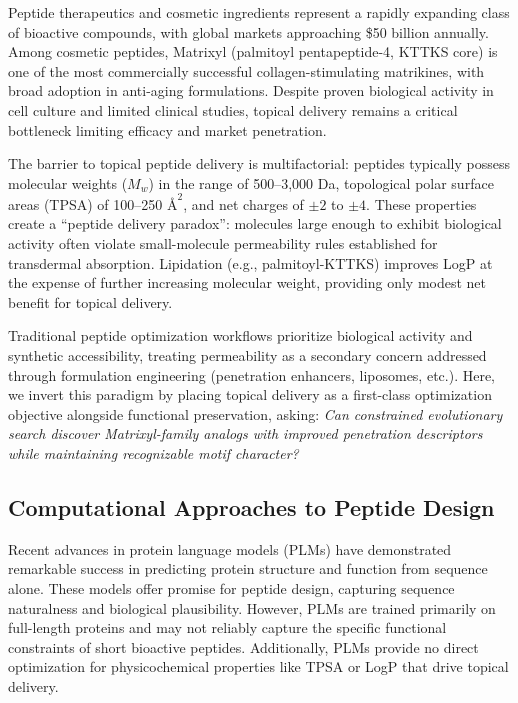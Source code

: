 \documentclass[11pt,a4paper]{article}
\begin{document}
Peptide therapeutics and cosmetic ingredients represent a rapidly expanding class of bioactive compounds, with global markets approaching \$50 billion annually\cite{peptide2024}. Among cosmetic peptides, Matrixyl (palmitoyl pentapeptide-4, KTTKS core) is one of the most commercially successful collagen-stimulating matrikines, with broad adoption in anti-aging formulations\cite{matrixyl2015}. Despite proven biological activity in cell culture and limited clinical studies, topical delivery remains a critical bottleneck limiting efficacy and market penetration\cite{peptide_delivery2020}.

The barrier to topical peptide delivery is multifactorial: peptides typically possess molecular weights ($M_w$) in the range of 500--3,000 Da, topological polar surface areas (TPSA) of 100--250 $\text{\AA}^2$, and net charges of $\pm 2$ to $\pm 4$. These properties create a ``peptide delivery paradox'': molecules large enough to exhibit biological activity often violate small-molecule permeability rules established for transdermal absorption\cite{potts1992}. Lipidation (e.g., palmitoyl-KTTKS) improves LogP at the expense of further increasing molecular weight, providing only modest net benefit for topical delivery\cite{pal_kttks2018}.

Traditional peptide optimization workflows prioritize biological activity and synthetic accessibility, treating permeability as a secondary concern addressed through formulation engineering (penetration enhancers, liposomes, etc.). Here, we invert this paradigm by placing topical delivery as a first-class optimization objective alongside functional preservation, asking: \textit{Can constrained evolutionary search discover Matrixyl-family analogs with improved penetration descriptors while maintaining recognizable motif character?}

\subsection{Computational Approaches to Peptide Design}

Recent advances in protein language models (PLMs) have demonstrated remarkable success in predicting protein structure and function from sequence alone\cite{esm2023, alphafold2021}. These models offer promise for peptide design, capturing sequence naturalness and biological plausibility. However, PLMs are trained primarily on full-length proteins and may not reliably capture the specific functional constraints of short bioactive peptides\cite{peptide_plm2023}. Additionally, PLMs provide no direct optimization for physicochemical properties like TPSA or LogP that drive topical delivery.
\end{document}
